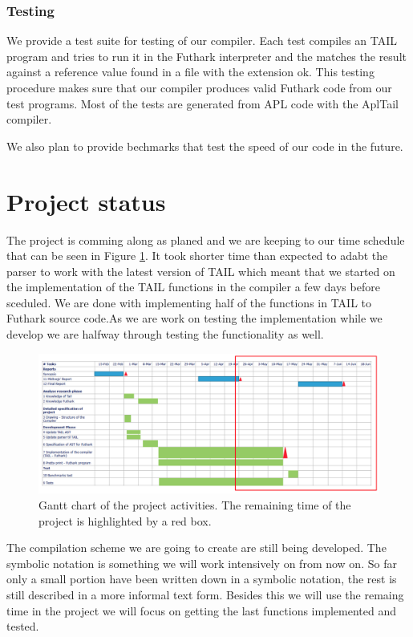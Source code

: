 \documentclass[11pt]{article}
\begin{document}
\subsubsection{Testing}

We provide a test suite for testing of our compiler.
Each test compiles an TAIL program and tries to run it in the Futhark interpreter and the matches the result against a reference value found in a file with the extension ok.
This testing procedure makes sure that our compiler produces valid Futhark code from our test programs.
Most of the tests are generated from APL code with the AplTail compiler.

We also plan to provide bechmarks that test the speed of our code in the future.

\section{Project status}
The project is comming along as planed and we are keeping to our time schedule that can be seen in Figure \ref{fig:gantt}.
It took shorter time than expected to adabt the parser to work with the latest version of TAIL
which meant that we started on the implementation of the TAIL functions in the compiler a few days before sceduled. 
We are done with implementing half of the functions in TAIL to Futhark source code.As we are work on testing the
implementation while we develop we are halfway through testing the functionality as well. 

\begin{figure}[width=\textwidth]%
    \centering
    \includegraphics[width=\textwidth]{midvejsgantt3.png}
    \caption{Gantt chart of the project activities. The remaining time of the project is highlighted by a red box.}
    \label{fig:gantt}
\end{figure}

The compilation scheme we are going to create are still being developed. The symbolic notation is something we will work intensively on from now on. So far only a small portion have been written down in a symbolic notation, the rest is still described in a more informal text form. 
Besides this we will use the remaing time in the project we will focus on getting the last functions implemented and tested.
\end{document}
